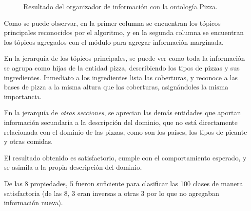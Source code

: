 \begin{figure}
\begin{multicols}{2}
\begin{figure}[H]
\end{figure}

\begin{figure}[H]
\end{figure}

\end{multicols}
\caption{Resultado del organizador de información con la ontología Pizza.}
\label{fig:caso_estudio_pizza}
\end{figure}

Como se puede observar, en la primer columna se encuentran los tópicos principales reconocidos por el algoritmo, y en la segunda columna se encuentran los tópicos agregados con el módulo para agregar información marginada.

En la jerarquía de los tópicos principales, se puede ver como toda la información se agrupa como hijas de la entidad pizza, describiendo los tipos de pizzas y sus ingredientes. Inmediato a los ingredientes lista las coberturas, y reconoce a las bases de pizza a la misma altura que las coberturas, asignándoles la misma importancia.

En la jerarquía de \emph{otras secciones}, se aprecian las demás entidades que aportan información secundaria a la descripción del dominio, que no está directamente relacionada con el dominio de las pizzas, como son los países, los tipos de picante y otras comidas.

El resultado obtenido es satisfactorio, cumple con el comportamiento esperado, y se asimila a la propia descripción del dominio. 

De las 8 propiedades, 5 fueron suficiente para clasificar las 100 clases de manera satisfactoria (de las 8, 3 eran inversas a otras 3 por lo que no agregaban información nueva).  

